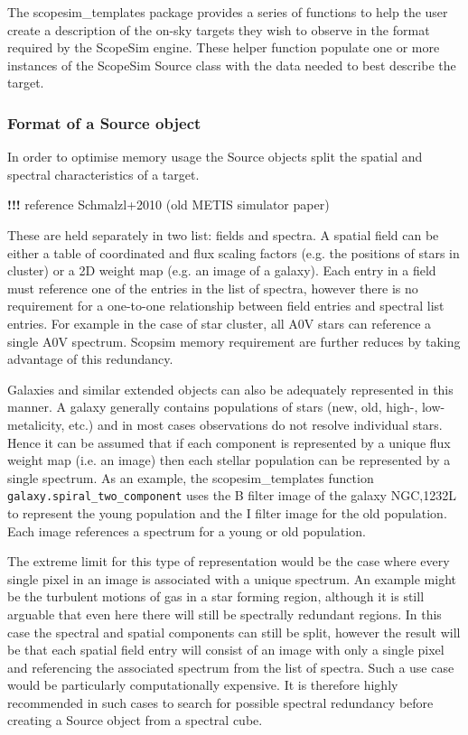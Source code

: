 The scopesim\_templates package provides a series of functions to help the user create a description of the on-sky targets they wish to observe in the format required by the ScopeSim engine.
These helper function populate one or more instances of the ScopeSim \textquotedbl{}Source\textquotedbl{} class with the data needed to best describe the target.


\subsubsection{Format of a Source object%
  \label{format-of-a-source-object}%
}

In order to optimise memory usage the Source objects split the spatial and spectral characteristics of a target.

\textbf{!!!} reference Schmalzl+2010 (old METIS simulator paper)

These are held separately in two list: fields and spectra.
A spatial field can be either a table of coordinated and flux scaling factors (e.g. the positions of stars in cluster) or a 2D weight map (e.g. an image of a galaxy).
Each entry in a field must reference one of the entries in the list of spectra, however there is no requirement for a one-to-one relationship between field entries and spectral list entries.
For example in the case of star cluster, all A0V stars can reference a single A0V spectrum.
Scopsim memory requirement are further reduces by taking advantage of this redundancy.

Galaxies and similar extended objects can also be adequately represented in this manner.
A galaxy generally contains populations of stars (new, old, high-, low-metalicity, etc.) and in most cases observations do not resolve individual stars.
Hence it can be assumed that if each component is represented by a unique flux weight map (i.e. an image) then each stellar population can be represented by a single spectrum.
As an example, the scopesim\_templates function \texttt{galaxy.spiral\_two\_component} uses the B filter image of the galaxy NGC,1232L to represent the young population and the I filter image for the old population.
Each image references a spectrum for a young or old population.

The extreme limit for this type of representation would be the case where every single pixel in an image is associated with a unique spectrum.
An example might be the turbulent motions of gas in a star forming region, although it is still arguable that even here there will still be spectrally redundant regions.
In this case the spectral and spatial components can still be split, however the result will be that each spatial field entry will consist of an image with only a single pixel and referencing the associated spectrum from the list of spectra.
Such a use case would be particularly computationally expensive.
It is therefore highly recommended in such cases to search for possible spectral redundancy before creating a \textquotedbl{}Source\textquotedbl{} object from a spectral cube.

